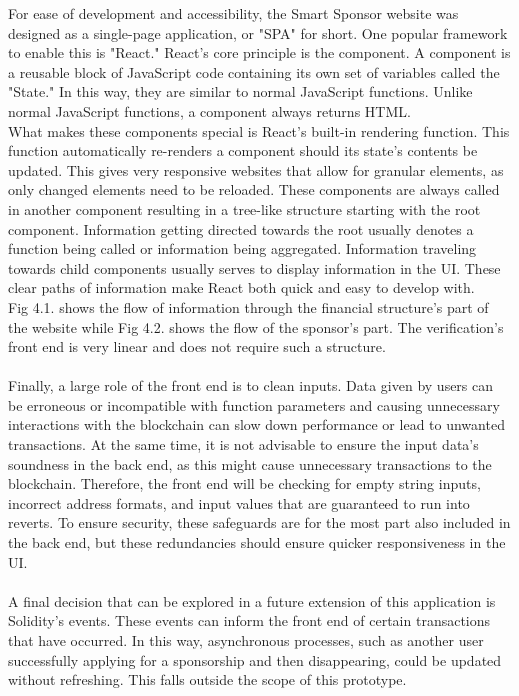 For ease of development and accessibility, the Smart Sponsor website was designed as a single-page application, or "SPA" for short. One popular framework to enable this is "React." React's core principle is the component. A component is a reusable block of JavaScript code containing its own set of variables called the "State." In this way, they are similar to normal JavaScript functions. Unlike normal JavaScript functions, a component always returns HTML.\\
What makes these components special is React's built-in rendering function. This function automatically re-renders a component should its state's contents be updated. This gives very responsive websites that allow for granular elements, as only changed elements need to be reloaded. These components are always called in another component resulting in a tree-like structure starting with the root component. Information getting directed towards the root usually denotes a function being called or information being aggregated. Information traveling towards child components usually serves to display information in the UI. These clear paths of information make React both quick and easy to develop with.\\
Fig 4.1. shows the flow of information through the financial structure's part of the website while Fig 4.2. shows the flow of the sponsor's part. The verification's front end is very linear and does not require such a structure.\\
\\
Finally, a large role of the front end is to clean inputs. Data given by users can be erroneous or incompatible with function parameters and causing unnecessary interactions with the blockchain can slow down performance or lead to unwanted transactions. At the same time, it is not advisable to ensure the input data's soundness in the back end, as this might cause unnecessary transactions to the blockchain. Therefore, the front end will be checking for empty string inputs, incorrect address formats, and input values that are guaranteed to run into reverts. To ensure security, these safeguards are for the most part also included in the back end, but these redundancies should ensure quicker responsiveness in the UI.\\
\\
A final decision that can be explored in a future extension of this application is Solidity's events. These events can inform the front end of certain transactions that have occurred. In this way, asynchronous processes, such as another user successfully applying for a sponsorship and then disappearing, could be updated without refreshing. This falls outside the scope of this prototype.